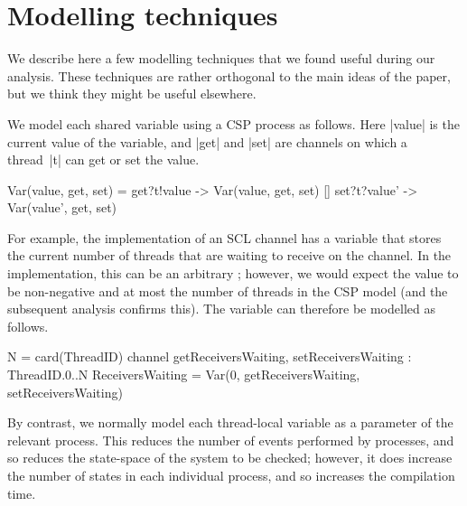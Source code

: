 \section{Modelling techniques}
\label{app:modelling}

\inlineCSP

We describe here a few modelling techniques that we found useful during our
analysis.  These techniques are rather orthogonal to the main ideas of the
paper, but we think they might be useful elsewhere. 

We model each shared variable using a CSP process as follows.  Here |value| is
the current value of the variable, and |get| and |set| are channels on which a
thread~|t| can get or set the value.
%
\begin{cspm}
Var(value, get, set) = 
  get?t!value -> Var(value, get, set)
  [] set?t?value' -> Var(value', get, set)
\end{cspm}
%
For example, the implementation of an SCL channel has a variable
 that stores the current number of threads that are
waiting to receive on the channel.  In the implementation, this can be an
arbitrary ; however, we would expect the value to be non-negative
and at most the number of threads in the CSP model (and the subsequent
analysis confirms this).  The variable can therefore be modelled as follows. 
%
\begin{cspm}
N = card(ThreadID)
channel getReceiversWaiting, setReceiversWaiting : ThreadID.{0..N}
ReceiversWaiting = Var(0, getReceiversWaiting, setReceiversWaiting)
\end{cspm}

By contrast, we normally model each thread-local variable as a parameter of
the relevant process.  This reduces the number of events performed by
processes, and so reduces the state-space of the system to be checked;
however, it does increase the number of states in each individual process, and
so increases the compilation time. 

